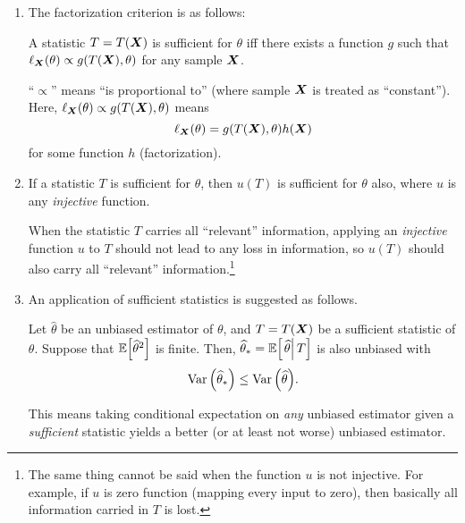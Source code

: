 \begin{enumerate}
\item The factorization criterion is as follows:
\begin{theorem}
\label{thm:fact-criterion}
A statistic \(T=T(\vb*{X})\) is sufficient for \(\theta\) iff there exists a
function \(g\) such that \(\ell_{\vb*{X}}\qty(\theta)\propto g(T(\vb*{X}),
\theta)\) for any sample \(\vb*{X}\).
\end{theorem}
\begin{note}
``\(\propto\)'' means ``is proportional to'' (where sample \(\vb*{X}\)
is treated as ``constant''). Here, \(\ell_{\vb*{X}}\qty(\theta)\propto
g(T(\vb*{X}), \theta)\) means
\[
\ell_{\vb*{X}}\qty(\theta)=g(T(\vb*{X}), \theta)h(\vb*{X})
\]
for some function \(h\) (factorization).
\end{note}

\item If a statistic \(T\) is sufficient for \(\theta\), then \(u(T)\) is
sufficient for \(\theta\) also, where \(u\) is any \emph{injective} function.

\begin{intuition}
When the statistic \(T\) carries all ``relevant'' information, applying an
\emph{injective} function \(u\) to \(T\) should not lead to any loss in
information, so \(u(T)\) should also carry all ``relevant''
information.\footnote{The same thing cannot be said when the function \(u\) is
not injective. For example, if \(u\) is zero function (mapping every input to
zero), then basically all information carried in \(T\) is lost.}
\end{intuition}

\item An application of sufficient statistics is suggested as follows.
\begin{theorem}
\label{thm:rao-blackwell}
Let \(\widehat{\theta}\) be an unbiased estimator of \(\theta\), and
\(T=T(\vb*{X})\) be a sufficient statistic of \(\theta\). Suppose that
\(\mathbb{E}\qty[\widehat{\theta}^{2}]\) is finite. Then,
\(\widehat{\theta}_*=\mathbb{E}\qty[\left.\widehat{\theta}\right|T]\) is also unbiased
with
\[
\operatorname{Var}\qty(\widehat{\theta}_*)\le \operatorname{Var}\qty(\widehat{\theta}).
\]
\end{theorem}
\begin{note}
This means taking conditional expectation on \emph{any} unbiased estimator
given a \emph{sufficient} statistic yields a better (or at least not worse)
unbiased estimator.
\end{note}
\end{enumerate}
